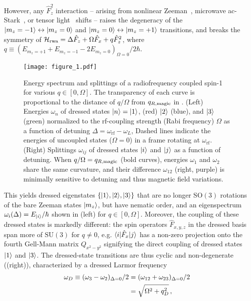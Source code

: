 \documentclass[aps,prl,reprint,superscriptaddress,floatfix]{revtex4-1}
\begin{document}
However, any $\hat{F}_z^2$ interaction -- arising from nonlinear Zeeman~\cite{ramsey_molecular_1956}, microwave ac-Stark~\cite{gerbier_resonant_2006}, or tensor light~\cite{smith_continuous_2004} shifts -- raises the degeneracy of the $\vert m_z=-1 \rangle  \leftrightarrow \vert m_z=0 \rangle $ and $\vert m_z=0 \rangle  \leftrightarrow \vert m_z=+1 \rangle $ transitions, and breaks the symmetry of $\mathcal{H}_{\text{rwa}} = \Delta \hat{F}_z + \Omega \hat{F}_x + q \hat{F}_z^2$, where $q \equiv (E_{m_z=+1} + E_{m_z=-1} - 2 E_{m_z=0})_{\Omega=0}/2\hbar$.
\begin{figure}
    \texttt{[image: figure\_1.pdf]}
    \caption{
    \label{fig:eigensystem_schematic}
        Energy spectrum and splittings of a radiofrequency coupled spin-1 for various $q \in [0,\Omega]$.
        The transparency of each curve is proportional to the distance of $q/\Omega$ from $q_{R,\text{magic}}$ in .
        (Left) Energies $\omega_n$ of dressed states $\vert n \rangle =\vert 1 \rangle $, (red) $\vert 2 \rangle $ (blue), and $\vert 3 \rangle $ (green) normalized to the rf-coupling strength (Rabi frequency) $\Omega$ as a function of detuning $\Delta=\omega_{\text{rf}}-\omega_L$,
        Dashed lines indicate the energies of uncoupled states ($\Omega=0$) in a frame rotating at $\omega_{\text{rf}}$.
        (Right) Splittings $\omega_{ij}$ of dressed states $\vert i \rangle $ and $\vert j \rangle $ as a function of detuning.
        When $q/\Omega=q_{R,\text{magic}}$ (bold curves), energies $\omega_1$ and $\omega_2$ share the same curvature, and their difference $\omega_{12}$ (right, purple) is minimally sensitive to detuning and thus magnetic field variations.
    }
\end{figure}
This yields dressed eigenstates $\{\vert 1 \rangle , \vert 2 \rangle , \vert 3 \rangle \}$ that are no longer $\text{SO}(3)$ rotations of the bare Zeeman states $\vert m_z \rangle $, but have nematic order, and an eigenspectrum $\omega_i(\Delta) = E_{\vert i \rangle }/\hbar$ shown in  (left) for $q \in [0, \Omega]$.
Moreover, the coupling of these dressed states is markedly different: the spin operators $\hat{F}_{x,y,z}$ in the dressed basis span more of $\text{SU}(3)$ for $q \neq 0$, e.g. $\langle i \vert  \hat{F}_x \vert j \rangle $ has a non-zero projection onto the fourth Gell-Mann matrix $Q_{x^2-y^2}$  signifying the direct coupling of dressed states $\vert 1 \rangle $ and $\vert 3 \rangle $.
The dressed-state transitions are thus cyclic and non-degenerate ((right)), characterized by a dressed Larmor frequency
\begin{align}
\label{eq:dressed_larmor}
    \omega_D \equiv (\omega_3 - \omega_2)_{\Delta=0}/2 &= (\omega_{12} + \omega_{23})_{\Delta=0}/2 \notag\\ &= \sqrt{\Omega^2 + q_D^2}\, ,
\end{align}
\end{document}
